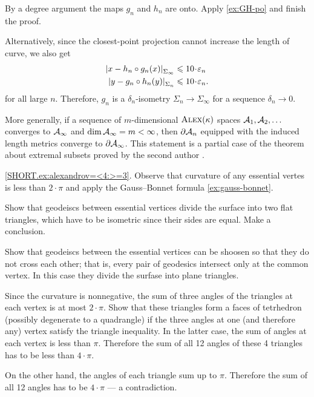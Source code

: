 By a degree argument the maps $g_n$ and $h_n$ are onto.
Apply \ref{ex:GH-po} and finish the proof.

Alternatively, since the closest-point projection cannot increase the length of curve, we also get
\begin{align*}
\dist{x}{h_n\circ g_n(x)}{\Sigma_\infty}&\le 10\cdot \eps_n
\\
\dist{y}{g_n\circ h_n(y)}{\Sigma_n}&\le 10\cdot \eps_n.
\end{align*}
for all large $n$.
Therefore, $g_n$ is a $\delta_n$-isometry $\Sigma_n\to\Sigma_\infty$ for a sequence $\delta_n\to 0$.

More generally, if a sequence of $m$-dimensional $\textsc{Alex}(\kappa)$ spaces $\mathcal{A}_1,\mathcal{A}_2,\dots$ converges to $\mathcal{A}_\infty$ and $\operatorname{\rm dim}\nolimits \mathcal{A}_\infty=m<\infty$,
then $\partial \mathcal{A}_n$ equipped with the induced length metrics converge to  $\partial \mathcal{A}_\infty$.
This statement is a partial case of the theorem about extremal subsets proved by the second author \cite[1.2]{petrunin1997}.

\ref{SHORT.ex:alexandrov=<4:>=3}. Observe that curvature of any essential vertes is less than $2\cdot\pi$ and apply the Gauss--Bonnet formula \ref{ex:gauss-bonnet}.

 Show that geodeiscs between essential vertices divide the surface into two flat triangles, which have to be isometric since their sides are equal.
Make a conclusion.

Show that geodeiscs between the essential vertices can be shoosen so that they do not cross each other;
that is, every pair of geodesics intersect only at the common vertex.
In this case they divide the surfase into plane triangles.

Since the curvature is nonnegative, the sum of three angles of the triangles at each vertex is at most $2\cdot\pi$.
Show that these triangles form a faces of tetrhedron (possibly degenerate to a quadrangle)
if the three angles at one (and therefore any) vertex satisfy the triangle inequality.
In the latter case, the sum of angles at each vertex is less than $\pi$.
Therefore the sum of all 12 angles of these 4 triangles has to be less than $4\cdot \pi$.

On the other hand, the angles of each triangle sum up to $\pi$.
Therefore the sum of all 12 angles has to be $4\cdot \pi$ --- a contradiction.

